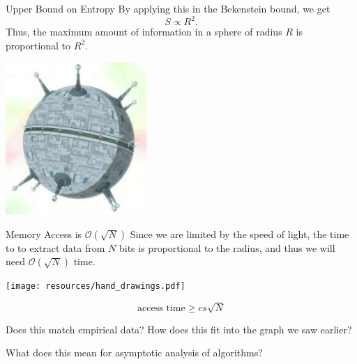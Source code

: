 \documentclass{beamer}
\begin{document}
\begin{frame}{Upper Bound on Entropy}
By applying this in the Bekenstein bound, we get
\[
  S \propto R^2.
\]
Thus, the maximum amount of information in a sphere of radius $R$ is proportional to $R^2$.


\begin{center}
  \includegraphics[width=0.4\textwidth]{resources/Infosphere.pdf}
\end{center}
\end{frame}


\begin{frame}{Memory Access is $\mathcal{O}(\sqrt{N})$}
  Since we are limited by the speed of light, the time to to extract data from $N$ bits is proportional to the radius, and thus we will need $\mathcal{O}(\sqrt{N})$ time.


\begin{center}
  \texttt{[image: resources/hand\_drawings.pdf]}
\end{center}

\vspace{-2cm}
\[
  \text{access time} \geq c s \sqrt{N}
\]
\end{frame}

\begin{frame}{Does this match empirical data?}
  How does this fit into the graph we saw earlier?


  \pause
  What does this mean for asymptotic analysis of algorithms?
\end{frame}
\end{document}
